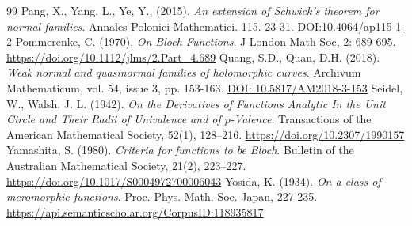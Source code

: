 \documentclass[10pt,a4paper]{amsart}
\numberwithin{equation}{section}
\begin{document}
\begin{thebibliography}{99}
 \label{pang-aeostfnf-2015} Pang, X., Yang, L., Ye, Y., (2015). \textit{An extension of Schwick's theorem for normal families}. Annales Polonici Mathematici. 115. 23-31. \url{DOI:10.4064/ap115-1-2}
 \label{pommerenke-obf-1970} Pommerenke, C. (1970), \textit{On Bloch Functions}. J London Math Soc, 2: 689-695. \url{https://doi.org/10.1112/jlms/2.Part_4.689}
 \label{quang-wnaqfohc-2018} Quang, S.D., Quan, D.H. (2018). \textit{Weak normal and quasinormal families of holomorphic curves}. Archivum Mathematicum, vol. 54, issue 3, pp. 153-163. \url{DOI: 10.5817/AM2018-3-153}
 \label{seidel-otdofaitucatrouaopv-1942} Seidel, W., Walsh, J. L. (1942). \textit{On the Derivatives of Functions Analytic In the Unit Circle and Their Radii of Univalence and of $p$-Valence}. Transactions of the American Mathematical Society, 52(1), 128–216. \url{https://doi.org/10.2307/1990157}
 \label{yamashita-cfftbb-1980} Yamashita, S. (1980). \textit{Criteria for functions to be Bloch}. Bulletin of the Australian Mathematical Society, 21(2), 223–227. \url{https://doi.org/10.1017/S0004972700006043}
 \label{yosida-oacomf-1934} Yosida, K. (1934). \textit{On a class of meromorphic functions}. Proc. Phys. Math. Soc. Japan, 227-235. \url{https://api.semanticscholar.org/CorpusID:118935817}
\end{thebibliography}
\end{document}
